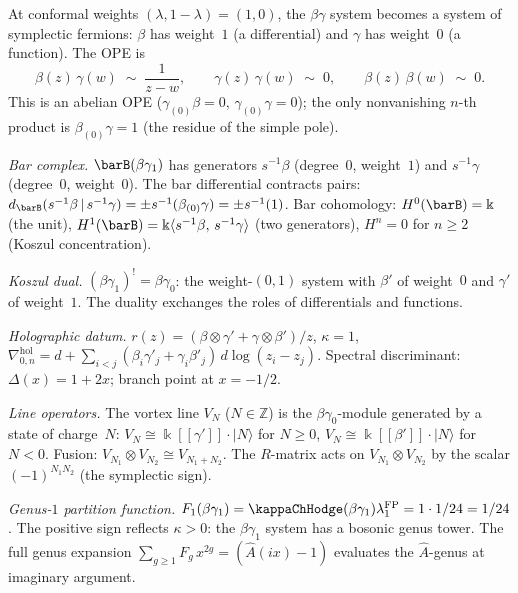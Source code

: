 \begin{computation}[$\beta\gamma$ at $\lambda=1$: symplectic
fermions as a holographic system; \ClaimStatusProvedHere]
\label{comp:symplectic-fermion-holographic}
At conformal weights $(\lambda,1{-}\lambda)=(1,0)$, the
$\beta\gamma$ system becomes a system of symplectic fermions:
$\beta$ has weight~$1$ (a differential) and $\gamma$ has
weight~$0$ (a function). The OPE is
\[
\beta(z)\,\gamma(w)\;\sim\;\frac{1}{z-w},
\qquad
\gamma(z)\,\gamma(w)\;\sim\;0,
\qquad
\beta(z)\,\beta(w)\;\sim\;0.
\]
This is an abelian OPE ($\gamma_{(0)}\beta=0$,
$\gamma_{(0)}\gamma=0$); the only nonvanishing $n$-th product
is $\beta_{(0)}\gamma=1$ (the residue of the simple pole).

\emph{Bar complex.}
$\barB(\beta\gamma_1)$ has generators $s^{-1}\beta$ (degree~$0$,
weight~$1$) and $s^{-1}\gamma$ (degree~$0$, weight~$0$).
The bar differential contracts pairs:
$d_{\barB}(s^{-1}\beta\,|\,s^{-1}\gamma)
=\pm s^{-1}(\beta_{(0)}\gamma)=\pm s^{-1}(1)$.
Bar cohomology: $H^0(\barB)=\Bbbk$ (the unit),
$H^1(\barB)=\Bbbk\langle s^{-1}\beta,\,s^{-1}\gamma\rangle$
(two generators), $H^n=0$ for $n\ge 2$ (Koszul concentration).

\emph{Koszul dual.}
$(\beta\gamma_1)^!=\beta\gamma_0$: the weight-$(0,1)$ system
with $\beta'$ of weight~$0$ and $\gamma'$ of weight~$1$.
The duality exchanges the roles of differentials and functions.

\emph{Holographic datum.}
$r(z)=(\beta\otimes\gamma'+\gamma\otimes\beta')/z$,
$\kappa=1$,
$\nabla^{\mathrm{hol}}_{0,n}
=d+\sum_{i<j}
(\beta_i\gamma'_j+\gamma_i\beta'_j)\,d\log(z_i-z_j)$.
Spectral discriminant: $\Delta(x)=1+2x$; branch point at
$x=-1/2$.

\emph{Line operators.}
The vortex line $V_N$ ($N\in\mathbb Z$) is the
$\beta\gamma_0$-module generated by a state of charge~$N$:
$V_N\cong\Bbbk[[\gamma']]\cdot|N\rangle$ for $N\ge 0$,
$V_N\cong\Bbbk[[\beta']]\cdot|N\rangle$ for $N<0$.
Fusion: $V_{N_1}\otimes V_{N_2}\cong V_{N_1+N_2}$.
The $R$-matrix acts on $V_{N_1}\otimes V_{N_2}$ by the scalar
$(-1)^{N_1 N_2}$ (the symplectic sign).

\emph{Genus-$1$ partition function.}
$F_1(\beta\gamma_1)
=\kappaChHodge(\beta\gamma_1)\lambda_1^{\mathrm{FP}}
=1 \cdot 1/24=1/24$.
The positive sign reflects $\kappa>0$: the $\beta\gamma_1$ system has
a bosonic genus tower. The full genus expansion
$\sum_{g\ge 1}F_g\,x^{2g}=(\hat A(ix)-1)$
evaluates the $\hat A$-genus at imaginary argument.
\end{computation}

